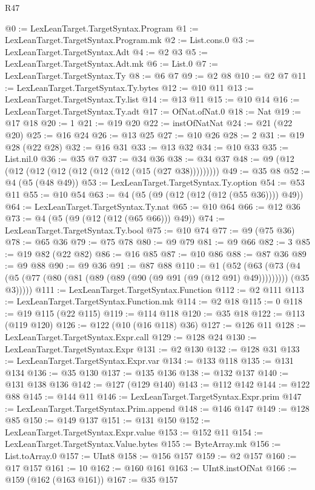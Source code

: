 \begin{lexlean}{R47}
\begin{coremodule}
@0 := LexLeanTarget.TargetSyntax.Program
@1 := LexLeanTarget.TargetSyntax.Program.mk
@2 := List.cons.{0}
@3 := LexLeanTarget.TargetSyntax.Adt
@4 := @2 @3
@5 := LexLeanTarget.TargetSyntax.Adt.mk
@6 := List.{0}
@7 := LexLeanTarget.TargetSyntax.Ty
@8 := @6 @7
@9 := @2 @8
@10 := @2 @7
@11 := LexLeanTarget.TargetSyntax.Ty.bytes
@12 := @10 @11
@13 := LexLeanTarget.TargetSyntax.Ty.list
@14 := @13 @11
@15 := @10 @14
@16 := LexLeanTarget.TargetSyntax.Ty.adt
@17 := OfNat.ofNat.{0}
@18 := Nat
@19 := @17 @18
@20 := 1
@21 := @19 @20
@22 := instOfNatNat
@24 := @21 (@22 @20)
@25 := @16 @24
@26 := @13 @25
@27 := @10 @26
@28 := 2
@31 := @19 @28 (@22 @28)
@32 := @16 @31
@33 := @13 @32
@34 := @10 @33
@35 := List.nil.{0}
@36 := @35 @7
@37 := @34 @36
@38 := @34 @37
@48 := @9 (@12 (@12 (@12 (@12 (@12 (@12 (@12 (@15 (@27 @38)))))))))
@49 := @35 @8
@52 := @4 (@5 (@48 @49))
@53 := LexLeanTarget.TargetSyntax.Ty.option
@54 := @53 @11
@55 := @10 @54
@63 := @4 (@5 (@9 (@12 (@12 (@12 (@55 @36)))) @49))
@64 := LexLeanTarget.TargetSyntax.Ty.nat
@65 := @10 @64
@66 := @12 @36
@73 := @4 (@5 (@9 (@12 (@12 (@65 @66))) @49))
@74 := LexLeanTarget.TargetSyntax.Ty.bool
@75 := @10 @74
@77 := @9 (@75 @36)
@78 := @65 @36
@79 := @75 @78
@80 := @9 @79
@81 := @9 @66
@82 := 3
@85 := @19 @82 (@22 @82)
@86 := @16 @85
@87 := @10 @86
@88 := @87 @36
@89 := @9 @88
@90 := @9 @36
@91 := @87 @88
@110 := @1
    (@52
      (@63
        (@73 (@4 (@5 (@77 (@80 (@81 (@89 (@89 (@90 (@9 @91 (@9 (@12 @91) @49))))))))) (@35 @3)))))
@111 := LexLeanTarget.TargetSyntax.Function
@112 := @2 @111
@113 := LexLeanTarget.TargetSyntax.Function.mk
@114 := @2 @18
@115 := 0
@118 := @19 @115 (@22 @115)
@119 := @114 @118
@120 := @35 @18
@122 := @113 (@119 @120)
@126 := @122 (@10 (@16 @118) @36)
@127 := @126 @11
@128 := LexLeanTarget.TargetSyntax.Expr.call
@129 := @128 @24
@130 := LexLeanTarget.TargetSyntax.Expr
@131 := @2 @130
@132 := @128 @31
@133 := LexLeanTarget.TargetSyntax.Expr.var
@134 := @133 @118
@135 := @131 @134
@136 := @35 @130
@137 := @135 @136
@138 := @132 @137
@140 := @131 @138 @136
@142 := @127 (@129 @140)
@143 := @112 @142
@144 := @122 @88
@145 := @144 @11
@146 := LexLeanTarget.TargetSyntax.Expr.prim
@147 := LexLeanTarget.TargetSyntax.Prim.append
@148 := @146 @147
@149 := @128 @85
@150 := @149 @137
@151 := @131 @150
@152 := LexLeanTarget.TargetSyntax.Expr.value
@153 := @152 @11
@154 := LexLeanTarget.TargetSyntax.Value.bytes
@155 := ByteArray.mk
@156 := List.toArray.{0}
@157 := UInt8
@158 := @156 @157
@159 := @2 @157
@160 := @17 @157
@161 := 10
@162 := @160 @161
@163 := UInt8.instOfNat
@166 := @159 (@162 (@163 @161))
@167 := @35 @157

\end{coremodule}
\end{lexlean}
